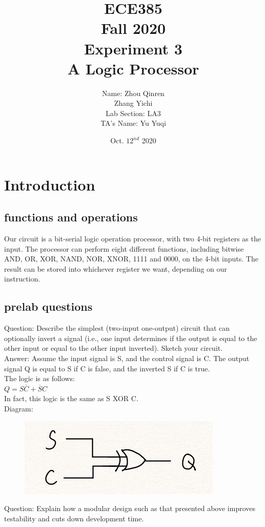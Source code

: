 \documentclass[12pt]{article}
\title{
    \textbf{\Huge ECE385} \\
    \huge Fall 2020 \\
    \huge Experiment 3 \\[120pt]
    \textbf{\Huge A Logic Processor} \\[120pt]
    }
\author{
    \large Name: Zhou Qinren \\ 
            \quad\qquad Zhang Yichi \\
    \large Lab Section: LA3 \\
    \large TA's Name: Yu Yuqi
    }
\date{Oct. $12^{nd}$ 2020}
\begin{document}
\setlength{\parindent}{0pt}
\maketitle
\newpage

\section{Introduction}
\subsection{functions and operations}
Our circuit is a bit-serial logic operation processor, with two 4-bit registers as the input. The processor can perform eight different functions, including bitwise AND, OR, XOR, NAND, NOR, XNOR, 1111 and 0000, on the 4-bit inputs. The result can be stored into whichever register we want, depending on our instruction.
\subsection{pre­lab questions}
Question: Describe the simplest (two-input one-output) circuit that can optionally invert a signal (i.e., one input determines if the output is equal to the other input or equal to the other input inverted). Sketch your circuit. \\

Answer: Assume the input signal is S, and the control signal is C. The output signal Q is equal to S if C is false, and the inverted S if C is true. \\
The logic is as follows: \\
$Q = S\overline{C} + \overline{S}C$ \\
In fact, this logic is the same as S XOR C. \\
Diagram: \\
\begin{figure}[H]
    \centering
    \includegraphics{prelab.png}
\end{figure}
Question: Explain how a modular design such as that presented above improves testability and cuts down development time. \\
\end{document}
